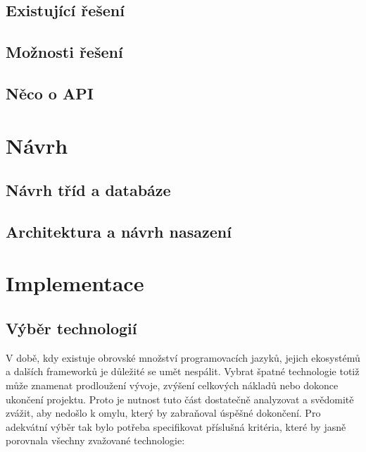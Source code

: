 \documentclass[thesis=B,czech]{FITthesis}[2012/06/26]
\begin{document}
\section{Existující řešení}


\section{Možnosti řešení}


\section{Něco o API}


\chapter{Návrh}

\section{Návrh tříd a databáze}


\section{Architektura a návrh nasazení}


\chapter{Implementace}

\section{Výběr technologií}

\indent

V době, kdy existuje obrovské množství programovacích jazyků, jejich ekosystémů a dalších frameworků je důležité se umět nespálit. 
Vybrat špatné technologie totiž může znamenat prodloužení vývoje, zvýšení celkových nákladů nebo dokonce ukončení projektu.
Proto je nutnost tuto část dostatečně analyzovat a svědomitě zvážit, aby nedošlo k omylu, který by zabraňoval úspěšné dokončení.
Pro adekvátní výběr tak bylo potřeba specifikovat příslušná kritéria, které by jasně porovnala všechny zvažované technologie:
\end{document}
